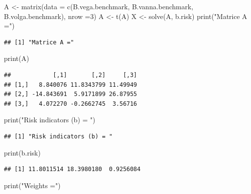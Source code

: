 \documentclass[
]{article}
\newenvironment{Shaded}{\begin{snugshade}}{\end{snugshade}}
\newcommand{\AttributeTok}[1]{\textcolor[rgb]{0.77,0.63,0.00}{#1}}
\newcommand{\DecValTok}[1]{\textcolor[rgb]{0.00,0.00,0.81}{#1}}
\newcommand{\FunctionTok}[1]{\textcolor[rgb]{0.00,0.00,0.00}{#1}}
\newcommand{\NormalTok}[1]{#1}
\newcommand{\OtherTok}[1]{\textcolor[rgb]{0.56,0.35,0.01}{#1}}
\newcommand{\StringTok}[1]{\textcolor[rgb]{0.31,0.60,0.02}{#1}}
\begin{document}
\begin{Shaded}
\begin{Highlighting}[]
\NormalTok{A }\OtherTok{\textless{}{-}} \FunctionTok{matrix}\NormalTok{(}\AttributeTok{data =} \FunctionTok{c}\NormalTok{(B.vega.benchmark, B.vanna.benchmark, B.volga.benchmark), }\AttributeTok{nrow =}\DecValTok{3}\NormalTok{)}
\NormalTok{A }\OtherTok{\textless{}{-}} \FunctionTok{t}\NormalTok{(A)}
\NormalTok{X }\OtherTok{\textless{}{-}} \FunctionTok{solve}\NormalTok{(A, b.risk)}
\FunctionTok{print}\NormalTok{(}\StringTok{"Matrice A ="}\NormalTok{)}
\end{Highlighting}
\end{Shaded}

\begin{verbatim}
## [1] "Matrice A ="
\end{verbatim}

\begin{Shaded}
\begin{Highlighting}[]
\FunctionTok{print}\NormalTok{(A)}
\end{Highlighting}
\end{Shaded}

\begin{verbatim}
##            [,1]       [,2]     [,3]
## [1,]   8.840076 11.8343799 11.49949
## [2,] -14.843691  5.9171899 26.87955
## [3,]   4.072270 -0.2662745  3.56716
\end{verbatim}

\begin{Shaded}
\begin{Highlighting}[]
\FunctionTok{print}\NormalTok{(}\StringTok{"Risk indicators (b) = "}\NormalTok{)}
\end{Highlighting}
\end{Shaded}

\begin{verbatim}
## [1] "Risk indicators (b) = "
\end{verbatim}

\begin{Shaded}
\begin{Highlighting}[]
\FunctionTok{print}\NormalTok{(b.risk)}
\end{Highlighting}
\end{Shaded}

\begin{verbatim}
## [1] 11.8011514 18.3980180  0.9256084
\end{verbatim}

\begin{Shaded}
\begin{Highlighting}[]
\FunctionTok{print}\NormalTok{(}\StringTok{"Weights ="}\NormalTok{)}
\end{Highlighting}
\end{Shaded}
\end{document}
